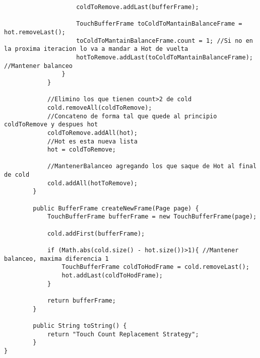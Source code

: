\begin{lstlisting}
        			coldToRemove.addLast(bufferFrame);
        			
        			TouchBufferFrame toColdToMantainBalanceFrame = hot.removeLast();
					toColdToMantainBalanceFrame.count = 1; //Si no en la proxima iteracion lo va a mandar a Hot de vuelta
					hotToRemove.addLast(toColdToMantainBalanceFrame); //Mantener balanceo
        		}  		
        	}
        	
    		//Elimino los que tienen count>2 de cold
    		cold.removeAll(coldToRemove);
    		//Concateno de forma tal que quede al principio coldToRemove y despues hot
    		coldToRemove.addAll(hot);
    		//Hot es esta nueva lista
    		hot = coldToRemove;
    		
    		//MantenerBalanceo agregando los que saque de Hot al final de cold 
    		cold.addAll(hotToRemove);
        }

        public BufferFrame createNewFrame(Page page) {
        	TouchBufferFrame bufferFrame = new TouchBufferFrame(page);
        	
        	cold.addFirst(bufferFrame);
        	
        	if (Math.abs(cold.size() - hot.size())>1){ //Mantener balanceo, maxima diferencia 1
        		TouchBufferFrame coldToHodFrame = cold.removeLast();
        		hot.addLast(coldToHodFrame);
        	}
        	
        	return bufferFrame;     
        }
        
        public String toString() {
            return "Touch Count Replacement Strategy";
        }
}
\end{lstlisting}
